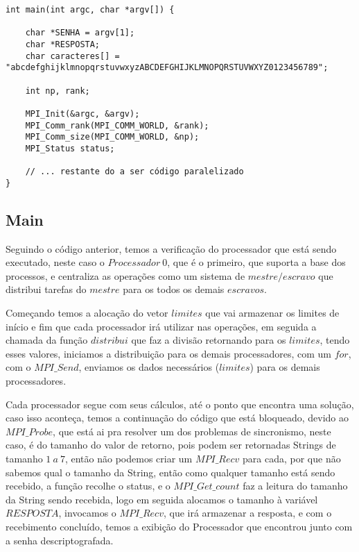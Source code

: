 \documentclass[10pt,journal,compsoc]{IEEEtran}
\begin{document}
\begin{verbatim}
int main(int argc, char *argv[]) {
    
    char *SENHA = argv[1];
    char *RESPOSTA;
    char caracteres[] = "abcdefghijklmnopqrstuvwxyzABCDEFGHIJKLMNOPQRSTUVWXYZ0123456789";
    
    int np, rank;
    
    MPI_Init(&argc, &argv);
    MPI_Comm_rank(MPI_COMM_WORLD, &rank);
    MPI_Comm_size(MPI_COMM_WORLD, &np);
    MPI_Status status;
    
    // ... restante do a ser código paralelizado
}
\end{verbatim}

\subsection{Main}
\label{sec:main}
Seguindo o código anterior, temos a verificação do processador que está sendo executado, neste caso o $Processador~0$, que é o primeiro, que suporta a base dos processos, e centraliza as operações como um sistema de $mestre/escravo$ que distribui tarefas do $mestre$ para os todos os demais $escravos$.

Começando temos a alocação do vetor $limites$ que vai armazenar os limites de início e fim que cada processador irá utilizar nas operações, em seguida a chamada da função $distribui$ que faz a divisão retornando para os $limites$, tendo esses valores, iniciamos a distribuição para os demais processadores, com um $for$, com o $MPI\_Send$, enviamos os dados necessários ($limites$) para os demais processadores.

Cada processador segue com seus cálculos, até o ponto que encontra uma solução, caso isso aconteça, temos a continuação do código que está bloqueado, devido ao $MPI\_Probe$, que está ai pra resolver um dos problemas de sincronismo, neste caso, é do tamanho do valor de retorno, pois podem ser retornadas Strings de tamanho $1~a~7$, então não podemos criar um $MPI\_Recv$ para cada, por que não sabemos qual o tamanho da String, então como qualquer tamanho está sendo recebido, a função recolhe o status, e o $MPI\_Get\_count$ faz a leitura do tamanho da String sendo recebida, logo em seguida alocamos o tamanho à variável $RESPOSTA$, invocamos o $MPI\_Recv$, que irá armazenar a resposta, e com o recebimento concluído, temos a exibição do Processador que encontrou junto com a senha descriptografada.
\end{document}
